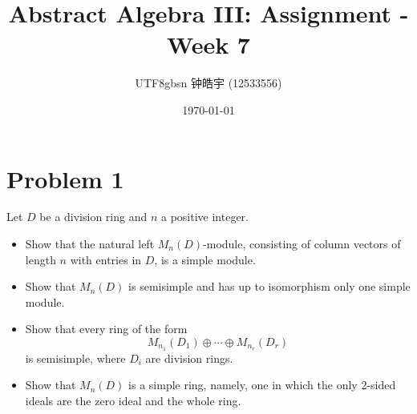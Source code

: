 \documentclass[12pt, a4paper]{article}
\title{Abstract Algebra III: Assignment - Week 7}
\author{
    \begin{CJK*}{UTF8}{gbsn}
    钟皓宇 (12533556)
    \end{CJK*}
}
\date{\today}
\theoremstyle{remark}
\begin{document}
\maketitle

\section*{Problem 1}

Let $D$ be a division ring and $n$ a positive integer.
\begin{itemize}
    \item[(a)] Show that the natural left $M_n(D)$-module, consisting of column vectors of length $n$ with entries in $D$, is a simple module.
    \item[(b)] Show that $M_n(D)$ is semisimple and has up to isomorphism only one simple module.
    \item[(c)] Show that every ring of the form
    \[ M_{n_1}(D_1) \oplus \cdots \oplus M_{n_r}(D_r) \]
    is semisimple, where $D_i$ are division rings.
    \item[(d)] Show that $M_n(D)$ is a simple ring, namely, one in which the only 2-sided ideals are the zero ideal and the whole ring.
\end{itemize}
\end{document}
